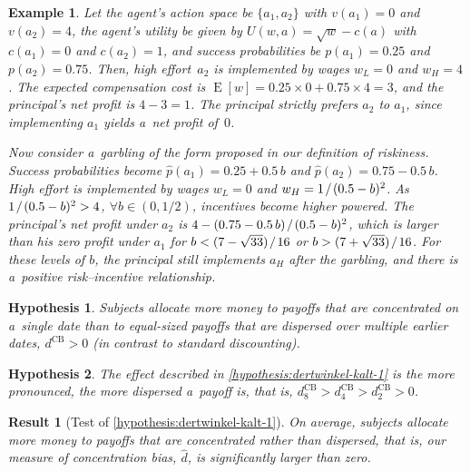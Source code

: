 \documentclass[12pt, a4paper, oneside]{article}
\newcommand*{\divslash}{%
	\mathbin{%
		\nonscript\mskip-2mu / \nonscript\mskip-2mu%
	}%
}  %
\theoremstyle{Plain}
\theoremstyle{Definition}
\newtheorem{example}{Beispiel}
\newtheorem{hypothesis}{Hypothese}
\newtheorem{result}{Resultat}
\newtheorem{example}{Example}
\newtheorem{hypothesis}{Hypothesis}
\newtheorem{result}{Result}
\theoremstyle{Remark}
\begin{document}
\begin{example}
	\label{example:budde-kraekel-2}
	Let the agent's action space be $\{a_1, a_2\}$ with ${v(a_1) = 0}$ and
	${v(a_2) = 4}$, the agent's utility be given by ${U(w, a) = \sqrt{w} - c(a)}$ with ${c(a_1) = 0}$ and ${c(a_2) = 1}$, and success probabilities be ${p(a_1) = 0.25}$ and ${p(a_2) = 0.75}$. Then, high effort~$a_2$ is implemented by wages ${w_L = 0}$ and ${w_H = 4}$. The expected compensation cost is ${\operatorname{E}[w] = 0.25 \times 0 + 0.75 \times 4 = 3}$, and the principal's net profit is ${4 - 3 = 1}$. The principal strictly prefers $a_2$ to $a_1$, since implementing $a_1$ yields a~net profit of~$0$. \par
	Now consider a~garbling of the form proposed in our definition of riskiness. Success probabilities become ${\hat{p}(a_1) = 0.25 + 0.5\,b}$ and ${\hat{p}(a_2) = 0.75 - 0.5\,b}$. High effort is implemented by wages ${w_L = 0}$ and ${w_H = 1 \divslash (0.5 - b)^2}$. As ${1 \divslash (0.5 - b)^2 > 4}$, ${\forall b \in (0, 1/2)}$, incentives become higher powered. The principal's net profit under $a_2$ is ${4 - (0.75 - 0.5\,b) \divslash (0.5 - b)^2}$, which is larger than his zero profit under $a_1$ for ${b < (7 - \sqrt{33}) \divslash 16}$ or ${b > (7 + \sqrt{33}) \divslash 16}$. For these levels of $b$, the principal still implements $a_H$ after the garbling, and there is a~positive risk--incentive relationship.
\end{example}

\begin{hypothesis}
	\label{hypothesis:dertwinkel-kalt-1}
	Subjects allocate more money to payoffs that are concentrated on a~single date than to equal-sized payoffs that are dispersed over multiple earlier dates, ${d^{\mathrm{CB}} > 0}$ (in contrast to standard discounting).
\end{hypothesis}

\begin{hypothesis}
	\label{hypothesis:dertwinkel-kalt-2}
	The effect described in \autoref{hypothesis:dertwinkel-kalt-1} is the more pronounced, the more dispersed a~payoff is, that is, ${d^{\mathrm{CB}}_8 > d^{\mathrm{CB}}_4 > d^{\mathrm{CB}}_2 > 0}$.
\end{hypothesis}

\begin{result}[Test of \autoref{hypothesis:dertwinkel-kalt-1}]
	\label{result:dertwinkel-kalt-1}
	On average, subjects allocate more money to payoffs that are concentrated rather than dispersed, that is, our measure of concentration bias, $\hat{d}$, is significantly larger than zero.
\end{result}
\end{document}
